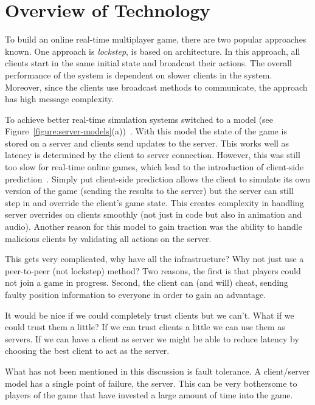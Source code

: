 
\section{Overview of Technology}

To build an online real-time multiplayer game, there are two popular approaches known. One approach is \ptoP \emph{lockstep}, is based on \ptoP architecture. In this approach, all clients start in the same initial state and broadcast their actions. The overall performance of the system is dependent on slower clients in the system. Moreover, since the clients use broadcast methods to communicate, the approach has high message complexity.

To achieve better real-time simulation systems switched to a \clientServer model (see Figure~\ref{figure:server-models}(a))~\cite{DOOMfaq}. With this model the state of the game is stored on a server and clients send updates to the server. This works well as latency is determined by the client to server connection. However, this was still too slow for real-time online games, which lead to the introduction of client-side prediction~\cite{bernier2001latency}. Simply put client-side prediction allows the client to simulate its own version of the game (sending the results to the server) but the server can still step in and override the client's game state. This creates complexity in handling server overrides on clients smoothly (not just in code but also in animation and audio). Another reason for this model to gain traction was the ability to handle malicious clients by validating all actions on the server.


This gets very complicated, why have all the infrastructure? Why not just use a peer-to-peer (not lockstep) method? Two reasons, the first is that players could not join a game in progress. Second, the client can (and will) cheat, sending faulty position information to everyone in order to gain an advantage.

It would be nice if we could completely trust clients but we can’t. What if we could trust them a little? If we can trust clients a little we can use them as servers. If we can have a client as server we might be able to reduce latency by choosing the best client to act as the server.

What has not been mentioned in this discussion is fault tolerance. A client/server model has a single point of failure, the server. This can be very bothersome to players of the game that have invested a large amount of time into the game. 

